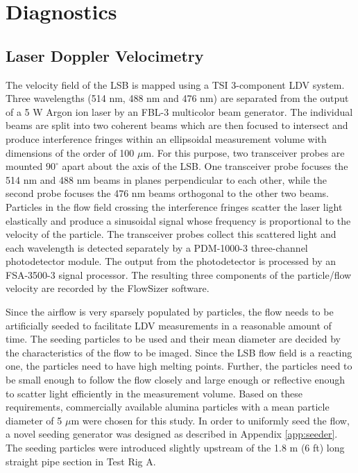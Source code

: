 \section{Diagnostics}

\subsection{Laser Doppler Velocimetry}

The velocity field of the LSB is mapped using a TSI 3-component LDV system.
Three wavelengths (514 nm, 488 nm and 476 nm) are separated from the output of a 5 W Argon ion laser by an FBL-3 multicolor beam generator.
The individual beams are split into two coherent beams which are then focused to intersect and produce interference fringes within an ellipsoidal measurement volume with dimensions of the order of 100 \(\mu\)m.
For this purpose, two transceiver probes are mounted \(90^\circ\) apart about the axis of the LSB.
One transceiver probe focuses the 514 nm and 488 nm beams in planes perpendicular to each other, while the second probe focuses the 476 nm beams orthogonal to the other two beams.
Particles in the flow field crossing the interference fringes scatter the laser light elastically and produce a sinusoidal signal whose frequency is proportional to the velocity of the particle.
The transceiver probes collect this scattered light and each wavelength is detected separately by a PDM-1000-3 three-channel photodetector module.
The output from the photodetector is processed by an FSA-3500-3 signal processor.
The resulting three components of the particle/flow velocity are recorded by the FlowSizer software.

Since the airflow is very sparsely populated by particles, the flow needs to be artificially seeded to facilitate LDV measurements in a reasonable amount of time.
The seeding particles to be used and their mean diameter are decided by the characteristics of the flow to be imaged.\cite{1997-melling}
Since the LSB flow field is a reacting one, the particles need to have high melting points.
Further, the particles need to be small enough to follow the flow closely and large enough or reflective enough to scatter light efficiently in the measurement volume.
Based on these requirements, commercially available alumina particles with a mean particle diameter of 5 \(\mu\)m were chosen for this study.
In order to uniformly seed the flow, a novel seeding generator was designed as described in Appendix \ref{app:seeder}.
The seeding particles were introduced slightly upstream of the 1.8 m (6 ft) long straight pipe section in Test Rig A.

